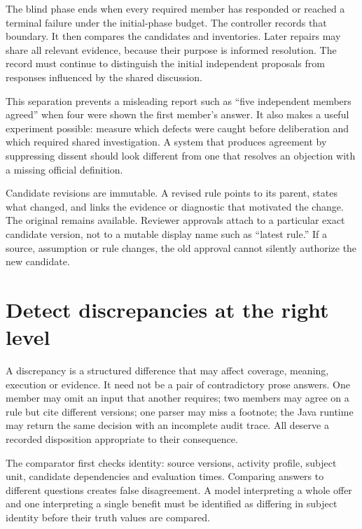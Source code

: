 \documentclass[12pt,a4paper,oneside,openany]{book}
\begin{document}
The blind phase ends when every required member has responded or reached a
terminal failure under the initial-phase budget. The controller records that
boundary. It then compares the candidates and inventories. Later repairs may
share all relevant evidence, because their purpose is informed resolution. The
record must continue to distinguish the initial independent proposals from
responses influenced by the shared discussion.

This separation prevents a misleading report such as ``five independent members
agreed'' when four were shown the first member's answer. It also makes a useful
experiment possible: measure which defects were caught before deliberation and
which required shared investigation. A system that produces agreement by
suppressing dissent should look different from one that resolves an objection
with a missing official definition.

Candidate revisions are immutable. A revised rule points to its parent, states
what changed, and links the evidence or diagnostic that motivated the change.
The original remains available. Reviewer approvals attach to a particular
exact candidate version, not to a mutable display name such as ``latest rule.'' If a
source, assumption or rule changes, the old approval cannot silently authorize
the new candidate.

\section{Detect discrepancies at the right level}
\label{merge:M06:05}


A discrepancy is a structured difference that may affect coverage, meaning,
execution or evidence. It need not be a pair of contradictory prose answers.
One member may omit an input that another requires; two members may agree on a
rule but cite different versions; one parser may miss a footnote; the Java
runtime may return the same decision with an incomplete audit trace. All deserve
a recorded disposition appropriate to their consequence.

The comparator first checks identity: source versions, activity profile, subject
unit, candidate dependencies and evaluation times. Comparing answers to different
questions creates false disagreement. A model interpreting a whole offer and one
interpreting a single benefit must be identified as differing in subject identity
before their truth values are compared.
\end{document}
